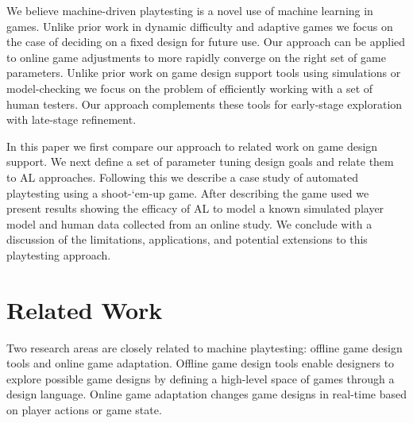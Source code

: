 \documentclass{sig-alternate}
\begin{document}
We believe machine-driven playtesting is a novel use of machine learning in games.
Unlike prior work in dynamic difficulty and adaptive games we focus on the case of deciding on a fixed design for future use.
Our approach can be applied to online game adjustments to more rapidly converge on the right set of game parameters.
Unlike prior work on game design support tools using simulations or model-checking we focus on the problem of efficiently working with a set of human testers.
Our approach complements these tools for early-stage exploration with late-stage refinement.

In this paper we first compare our approach to related work on game design support.
We next define a set of parameter tuning design goals and relate them to AL approaches.
Following this we describe a case study of automated playtesting using a shoot-`em-up game.
After describing the game used we present results showing the efficacy of AL to model a known simulated player model and human data collected from an online study.
We conclude with a discussion of the limitations, applications, and potential extensions to this playtesting approach.




\section{Related Work}

Two research areas are closely related to machine playtesting: offline game design tools and online game adaptation.
Offline game design tools enable designers to explore possible game designs by defining a high-level space of games through a design language.
Online game adaptation changes game designs in real-time based on player actions or game state.
\end{document}
